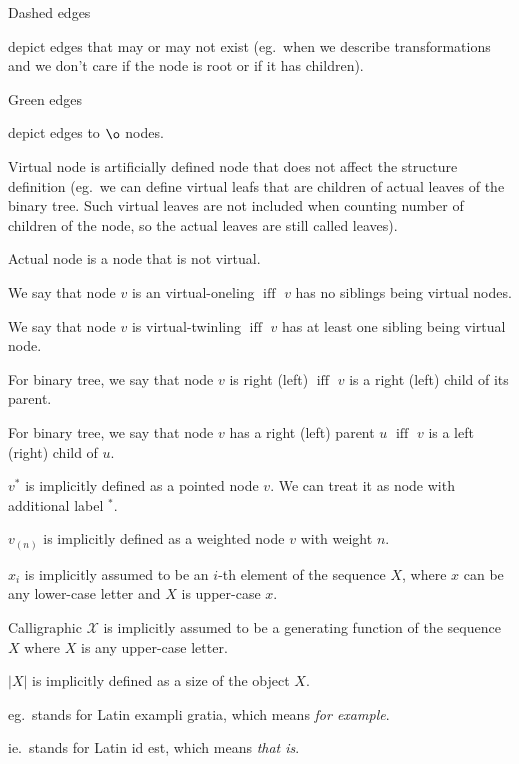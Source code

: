 \documentclass[final]{article}
\theoremstyle{definition}
\theoremstyle{remark}
\newcommand{\gf}[1]{\ensuremath{\mathcal{#1}}}
\newcommand{\pointed}[1]{\ensuremath{{#1}^*}}
\newcommand{\weighted}[1]{\ensuremath{_{(#1)}}}
\newcommand{\size}[1]{\ensuremath{\left|#1\right|}}
\DeclareMathOperator{\textiff}{\text{iff}}
\DeclareMathOperator{\no}{\o}
\begin{document}
Dashed edges 
\begin{minipage}{1.5em}

\end{minipage}
depict edges that may or may not exist (eg.\ when we describe transformations and we don't care if the node is root or if it has children).

Green edges 
\begin{minipage}{1.5em}

\end{minipage}
depict edges to \(\no\) nodes.

Virtual node is artificially defined node that does not affect the structure definition (eg.\ we can define virtual leafs that are children of actual leaves of the binary tree. Such virtual leaves are not included when counting number of children of the node, so the actual leaves are still called leaves).

Actual node is a node that is not virtual.

We say that node \(v\) is an virtual-oneling \(\textiff\) \(v\) has no siblings being virtual nodes.

We say that node \(v\) is virtual-twinling \(\textiff\) \(v\) has at least one sibling being virtual node.

For binary tree, we say that node \(v\) is right (left) \(\textiff\) \(v\) is a right (left) child of its parent.

For binary tree, we say that node \(v\) has a right (left) parent \(u\) \(\textiff\) \(v\) is a left (right) child of \(u\).

\(\pointed{v}\) is implicitly defined as a pointed node \(v\). We can treat it as node with additional label \(\pointed{}\).

\(v\weighted{n}\) is implicitly defined as a weighted node \(v\) with weight \(n\).

\(x_i\) is implicitly assumed to be an \(i\)-th element of the sequence \(X\), where \(x\) can be any lower-case letter and \(X\) is upper-case \(x\).

Calligraphic \(\gf{X}\) is implicitly assumed to be a generating function of the sequence \(X\) where \(X\) is any upper-case letter.

\(\size{X}\) is implicitly defined as a size of the object \(X\).

eg.\ stands for Latin exampli gratia, which means \textit{for example}.

ie.\ stands for Latin id est, which means \textit{that is}.
\end{document}
